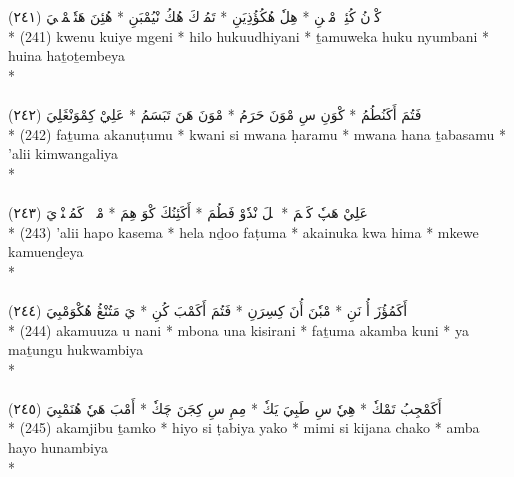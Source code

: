 \documentclass[a4paper, 12pt]{report}
\begin{document}
\begin{center}
\textarabic{(٢٤١) \textcolor{mygreen}{كْوٖنُ كُئِيٖ مْڠٖنِ  * هِلٗ هُكُؤُذِيَنِ  * تَمُوٖكَ هُكُ نْيُمْبَنِ  * هُئِنَ هَتٗتٖمْبٖيَ }} \\* 
(241) kwenu kuiye mgeni  * hilo hukuudhiyani  * ṯamuweka huku nyumbani  * huina haṯoṯembeya  \\* 
 \\ 
\\[8mm] 

\textarabic{(٢٤٢) \textcolor{mygreen}{فَتُمَ أَكَنُطُمُ  * كْوَنِ سِ مْوَنَ حَرَمُ  * مْوَنَ هَنَ تَبَسَمُ  * عَلِيْ كِمْوَنْڠَلِيَ }} \\* 
(242) faṯuma akanuṭumu  * kwani si mwana ḥaramu  * mwana hana ṯabasamu  * 'alii kimwangaliya  \\* 
 \\ 
\\[8mm] 

\textarabic{(٢٤٣) \textcolor{mygreen}{عَلِيْ هَپٗ كَسٖمَ  * هٖلَ نْدٗوْ فَطُمَ  * أَكَئِنُكَ كْوَ هِمَ  * مْكٖوٖ كَمُئٖنْدٖيَ }} \\* 
(243) 'alii hapo kasema  * hela nḏoo faṭuma  * akainuka kwa hima  * mkewe kamuenḏeya  \\* 
 \\ 
\\[8mm] 

\textarabic{(٢٤٤) \textcolor{mygreen}{أَكَمُؤُزَ أُ نَنِ  * مْبٗنَ أُنَ كِسِرَنِ  * فَتُمَ أَكَمْبَ كُنِ  * يَ مَتُنْڠُ هُكْوَمْبِيَ }} \\* 
(244) akamuuza u nani  * mbona una kisirani  * faṯuma akamba kuni  * ya maṯungu hukwambiya  \\* 
 \\ 
\\[8mm] 

\textarabic{(٢٤٥) \textcolor{mygreen}{أَكَمْجِبُ تَمْكٗ  * هِيٗ سِ طَبِيَ يَكٗ  * مِمِ سِ كِجَنَ چَكٗ  * أَمْبَ هَيٗ هُنَمْبِيَ }} \\* 
(245) akamjibu ṯamko  * hiyo si ṭabiya yako  * mimi si kijana chako  * amba hayo hunambiya  \\* 
 \\ 
\\[8mm] 


\end{center}
\end{document}
